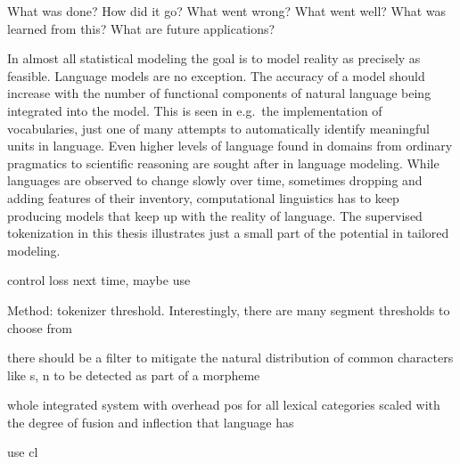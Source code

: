 \usepackage{biblatex}What was done?
How did it go?
What went wrong?
What went well?
What was learned from this?
What are future applications?

In almost all statistical modeling the goal is to model reality as precisely as feasible.
Language models are no exception.
The accuracy of a model should increase with the number of functional components of natural language being integrated into the model.
This is seen in e.g.\ the implementation of vocabularies, just one of many attempts to automatically identify meaningful units in language.
Even higher levels of language found in domains from ordinary pragmatics to scientific reasoning are sought after in language modeling.
While languages are observed to change slowly over time, sometimes dropping and adding features of their inventory, computational linguistics has to keep producing models that keep up with the reality of language.
The supervised tokenization in this thesis illustrates just a small part of the potential in tailored modeling.

control loss next time, maybe use ~\textcite{bertbasegermancasedsequel}

Method: tokenizer threshold.
Interestingly, there are many segment thresholds to choose from

there should be a filter to mitigate the natural distribution of common characters like s, n to be detected as  part of a morpheme

whole integrated system with overhead pos for all lexical categories
scaled with the degree of fusion and inflection that language has

use \ac{cl}